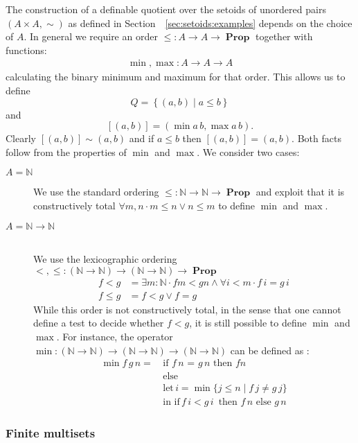 \documentclass[envcountsame]{llncs}
\newcommand{\N}{\mathbb{N}}
\providecommand{\set}  [1]{\left\{#1\right\}}
\DeclareMathOperator{\Prop}{\mathbf{Prop}}
\begin{document}
The construction of a definable quotient over the setoids of unordered pairs $(A\times A,\sim)$ as defined in Section~~\ref{sec:setoids:examples} depends on the choice of $A$. In general we
require an order $\leq : A \to A \to \Prop$ together with functions:
\begin{align*}
\min, \max : A \to A \to A
\end{align*}
calculating the binary minimum and maximum for that order. This allows us to  define 
\[
Q = \set{(a , b) \mid  a \leq b}
\]
and
\[ [(a,b)] = (\min a\, b, \max a \,b).\]
Clearly $[(a,b)] \sim (a,b)$ and if $a\leq b$ then $[(a,b)]=(a,b)$. Both facts follow from
 the properties of $\min$ and $\max$. We consider two cases:
\begin{description}
\item[$A = \N$] \hfill

We use the standard ordering $\leq : \N \to \N \to \Prop$ and exploit
that it is constructively total $\forall m ,n\cdot m \leq n \lor n \leq m$ to define $\min$ and
$\max$.
\item[$A=\N\to\N$] \hfill\\
We use the lexicographic ordering ${<},{\leq}:(\N \to \N) \to (\N\to\N)\to\Prop$
\begin{align*}
f < g & = \exists m:\N \cdot f m < g n \wedge \forall i<m\cdot f\,i = g \,i\\
f \leq g &= f < g \vee f=g
\end{align*}
While this order is not constructively total, in the sense that one cannot define a test to decide whether $f<g$, it is still possible to define $\min$ and $\max$.
For instance, the operator $\min : (\N \to \N) \to (\N\to\N) \to (\N \to \N)$ can be defined as :
\begin{align*}
 \min f\,g\,n =\,&\text{if $f \,n$ = $g\,n$ then $f n$}\\
                 &\text{else }\\
                 &\text{let}\,i = \min \{ j \leq n \mid f\,j \not= g\,j \}\\
                 &\text{in }\text{if}\, f\,i< g\,i\,\text{ then } f\,n \text{ else } g\,n
\end{align*}
\end{description}


\subsubsection*{Finite multisets}
\end{document}
